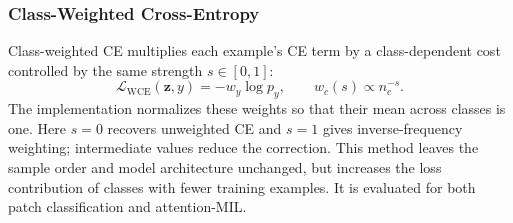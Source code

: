 \documentclass[11pt]{article}
\begin{document}
\subsubsection{Class-Weighted Cross-Entropy}
Class-weighted CE multiplies each example's CE term by a class-dependent cost controlled by the same strength $s\in[0,1]$:
\begin{equation}
  \mathcal{L}_{\mathrm{WCE}}(\mathbf{z},y) = -w_y\log p_y,
  \qquad
  w_c(s) \propto n_c^{-s}.
  \label{eq:weighted-ce}
\end{equation}
The implementation normalizes these weights so that their mean across classes is one. Here $s=0$ recovers unweighted CE and $s=1$ gives inverse-frequency weighting; intermediate values reduce the correction. This method leaves the sample order and model architecture unchanged, but increases the loss contribution of classes with fewer training examples. It is evaluated for both patch classification and attention-MIL.
\end{document}
